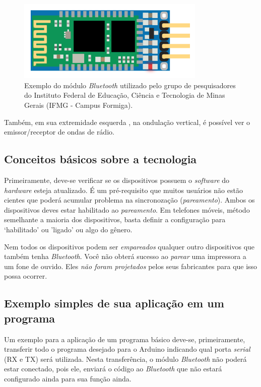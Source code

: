 \documentclass[portugues, brazil, a4paper,12pt]{article}
\begin{document}
\begin{figure}[h]
	\centering
	\includegraphics[width=0.8\textwidth]{modulo.png}
	\caption{Exemplo do módulo \textit{Bluetooth} utilizado pelo grupo de pesquisadores do Instituto Federal de Educação, Ciência e Tecnologia de Minas Gerais (IFMG - Campus Formiga).}
	\label{fig:modulo}
\end{figure}

Também, em sua extremidade esquerda , na ondulação vertical, é possível ver o emissor/receptor de ondas de rádio.

\subsection{Conceitos básicos sobre a tecnologia}
Primeiramente, deve-se verificar se os dispositivos possuem o \textit{software} do \textit{hardware} esteja atualizado. É um pré-requisito que muitos usuários não estão cientes que poderá acumular problema na sincronozação (\textit{pareamento}). Ambos os dispositivos deves estar habilitado ao \textit{pareamento}. Em telefones móveis, método semelhante a maioria dos dispositivos, basta definir a configuração para `habilitado' ou 'ligado' ou algo do gênero.

Nem todos os dispositivos podem ser \textit{empareados} qualquer outro dispositivos que também tenha \textit{Bluetooth}. Você não obterá sucesso ao \textit{parear} uma impressora a um fone de ouvido. Eles \textit{não foram projetados} pelos seus fabricantes para que isso possa ocorrer.


\subsection{Exemplo simples de sua aplicação em um programa}
Um exemplo para a aplicação de um programa básico deve-se, primeiramente, transferir todo o programa desejado para o Arduino indicando qual porta \textit{serial} (RX e TX) será utilizada. Nesta transferência, o módulo \textit{Bluetooth} não poderá estar conectado, pois ele, enviará o código ao \textit{Bluetooth} que não estará configurado ainda para sua função ainda.
\end{document}
